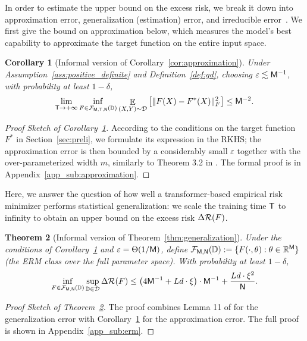 \documentclass[11pt]{article}
\let\citet\citep
\theoremstyle{plain}
\newtheorem{theorem}{Theorem}[section]
\newtheorem{corollary}[theorem]{Corollary}
\newcommand{\R}{\mathbb{R}}
\DeclareMathOperator*{\E}{{\mathbb{E}}}
\begin{document}
In order to estimate the upper bound on the excess risk, we break it down into approximation error, generalization (estimation) error, and irreducible error~\citep{suz18, lcl+21}. We first give the bound on approximation below, which measures the model's best capability to approximate the target function on the entire input space.
\begin{corollary}[Informal version of Corollary~\ref{cor:approximation}]\label{cor:approximation:informal}
    Under Assumption~\ref{ass:positive_definite} and Definition~\ref{def:gd}, choosing $\varepsilon\lesssim {\sf M}^{-1}$, with probability at least $1-\delta$,
    \begin{align*}
        \lim_{{\sf T}\to+\infty}\inf_{F\in{\cal F}_{\sf M,T,N}(\mathbb{D})}\E_{(X,Y)\sim \mathcal{D}}\big[\|F(X)-F^*(X)\|_F^2\big] \le {\sf M}^{-2}.
    \end{align*}
\end{corollary}
\begin{proof}[Proof Sketch of Corollary~\ref{cor:approximation:informal}]
    According to the conditions on the target function $F^*$ in Section~\ref{sec:preli}, we formulate its expression in the RKHS; the approximation error is then bounded by a considerably small $\varepsilon$ together with the over-parameterized width $m$, similarly to Theorem 3.2 in \citet{adh+19}. The formal proof is in Appendix~\ref{app_sub:approximation}.
\end{proof}

Here, we answer the question of how well a transformer-based empirical risk minimizer performs statistical generalization: we scale the training time ${\sf T}$ to infinity to obtain an upper bound on the excess risk $\Delta{\cal R}(F)$.
\begin{theorem}[Informal version of Theorem~\ref{thm:generalization}]\label{thm:generalization:informal}
    Under the conditions of Corollary~\ref{cor:approximation:informal} and $\varepsilon=\Theta(1/{\sf M})$, define ${\cal F}_{\sf M, N}(\mathbb{D}) := \{F(\cdot,\theta) : \theta\in\R^{\sf M}\}$ (the ERM class over the full parameter space). With probability at least $1-\delta$,
    \begin{align*}
        \inf_{F\in{\cal F}_{\sf M,N}(\mathbb{D})}\sup_{\mathbb{D}\in{\cal D}}\Delta{\cal R}(F) \le \big(4{\sf M}^{-1}+Ld\cdot \xi\big)\cdot {\sf M}^{-1}+\frac{Ld\cdot \xi^2}{\sf N}.
    \end{align*}
\end{theorem}
\begin{proof}[Proof Sketch of Theorem~\ref{thm:generalization:informal}]
    The proof combines Lemma 11 of \citet{sch17} for the generalization error with Corollary~\ref{cor:approximation:informal} for the approximation error. The full proof is shown in Appendix~\ref{app_sub:erm}.
\end{proof}
\end{document}
